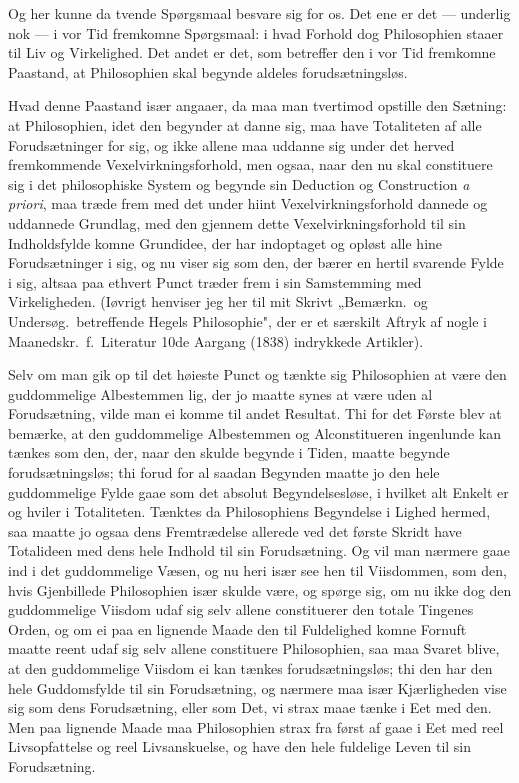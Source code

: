 \documentclass[12pt,a4paper]{book}
\begin{document}
{\small Og her kunne da tvende Spørgsmaal besvare sig for os. Det ene er det ---
underlig nok --- i vor Tid fremkomne Spørgsmaal: i hvad Forhold dog Philosophien
staaer til Liv og Virkelighed. Det andet er det, som betreffer den i vor Tid
fremkomne Paastand, at Philosophien skal begynde aldeles forudsætningsløs.\par}

{\small Hvad denne Paastand især angaaer, da maa man tvertimod opstille den Sætning:
at Philosophien, idet den begynder at danne sig, maa have Totaliteten af alle
Forudsætninger for sig, og ikke allene maa uddanne sig under det herved fremkommende
Vexelvirkningsforhold, men ogsaa, naar den nu skal constituere sig i det
philosophiske System og begynde sin Deduction og Construction \textit{a priori}, maa
træde frem med det under hiint Vexelvirkningsforhold dannede og uddannede Grundlag,
med den gjennem dette Vexelvirkningsforhold til sin Indholdsfylde komne Grundidee,
der har indoptaget og opløst alle hine Forudsætninger i sig, og nu viser sig som den,
der bærer en hertil svarende Fylde i sig, altsaa paa ethvert Punct træder frem i sin
Samstemming med Virkeligheden. (Iøvrigt henviser jeg her til mit Skrivt „Bemærkn.\ og
Undersøg.\ betreffende Hegels Philosophie", der er et særskilt Aftryk af nogle i
Maanedskr.\ f.\ Literatur 10de Aargang (1838) indrykkede Artikler).\par}

{\small Selv om man gik op til det høieste Punct og tænkte sig Philosophien at være
den guddommelige Albestemmen lig, der jo maatte synes at være uden al Forudsætning,
vilde man ei komme til andet Resultat. Thi for det Første blev at bemærke, at den
guddommelige Albestemmen og Alconstitueren ingenlunde kan tænkes som den, der, naar
den skulde begynde i Tiden, maatte begynde forudsætningsløs; thi forud for al saadan
Begynden maatte jo den hele guddommelige Fylde gaae som det absolut Begyndelsesløse, i
hvilket alt Enkelt er og hviler i Totaliteten. Tænktes da Philosophiens Begyndelse i
Lighed hermed, saa maatte jo ogsaa dens Fremtrædelse allerede ved det første Skridt
have Totalideen med dens hele Indhold til sin Forudsætning. Og vil man nærmere gaae
ind i det guddommelige Væsen, og nu heri især see hen til Viisdommen, som den, hvis
Gjenbillede Philosophien især skulde være, og spørge sig, om nu ikke dog den
guddommelige Viisdom udaf sig selv allene constituerer den totale Tingenes Orden, og
om ei paa en lignende Maade den til Fuldelighed komne Fornuft maatte reent udaf sig
selv allene constituere Philosophien, saa maa Svaret blive, at den guddommelige
Viisdom ei kan tænkes forudsætningsløs; thi den har den hele Guddomsfylde til sin
Forudsætning, og nærmere maa især Kjærligheden vise sig som dens Forudsætning, eller
som Det, vi strax maae tænke i Eet med den. Men paa lignende Maade maa Philosophien
strax fra først af gaae i Eet med reel Livsopfattelse og reel Livsanskuelse, og have
den hele fuldelige Leven til sin Forudsætning.\par}
\end{document}
